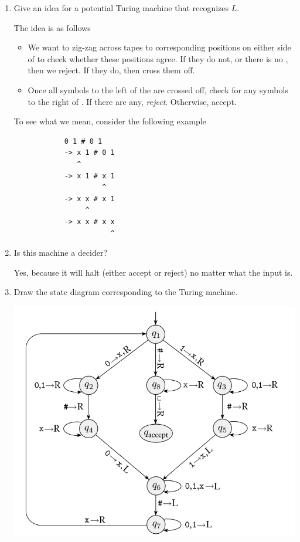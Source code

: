 \documentclass[letterpaper]{article}
\begin{document}
\begin{enumerate}
    \item Give an idea for a potential Turing machine that recognizes $L$.

    \begin{mdframed}[]
        The idea is as follows
        \begin{itemize}
            \item We want to zig-zag across tapes to corresponding positions on either side of \code{\#} to check whether these positions agree. If they do not, or there is no \code{\#}, then we reject. If they do, then cross them off. 
            \item Once all symbols to the left of the \code{\#} are crossed off, check for any symbols to the right of \code{\#}. If there are any, \emph{reject}. Otherwise, accept.
        \end{itemize}
        To see what we mean, consider the following example  
        \begin{verbatim}
            0 1 # 0 1
            -> x 1 # 0 1
               ^
            -> x 1 # x 1
                     ^ 
            -> x x # x 1
                 ^ 
            -> x x # x x
                       ^
        \end{verbatim}
    \end{mdframed}

    \item Is this machine a decider? 
    \begin{mdframed}[]
        Yes, because it will halt (either accept or reject) no matter what the input is. 
    \end{mdframed}

    \item Draw the state diagram corresponding to the Turing machine. 
    \begin{mdframed}[nobreak=true]
        \begin{center}
            \includegraphics[scale=0.7]{assets/turing_1.png}
        \end{center}


\end{mdframed}
\end{enumerate}
\end{document}
